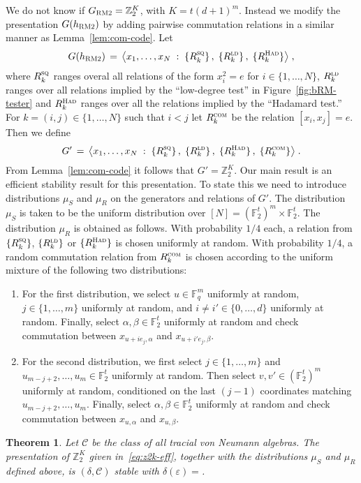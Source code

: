 \documentclass[11pt]{article}
\newtheorem{theorem}{Theorem}[section]
\theoremstyle{definition}
\newcommand{\F}{\ensuremath{\mathbb{F}}}
\newcommand{\ld}{\textsc{ld}}
\newcommand{\com}{\textsc{com}}
\newcommand{\sq}{\textsc{sq}}
\newcommand{\Z}{\ensuremath{\mathbb{Z}}}
\newcommand{\mC}{\ensuremath{\mathcal{C}}}
\newcommand{\bRM}{\ensuremath{\textsc{RM2}}}
\newcommand{\had}{\textsc{Had}}
\newcommand{\eps}{\varepsilon}
\begin{document}
We do not know if $G_\bRM = \Z_2^K$, with $K=t(d+1)^m$. Instead we modify the presentation $G(h_\bRM)$ by adding pairwise commutation relations in a similar manner as Lemma~\ref{lem:com-code}. Let 
\[ G(h_\bRM) \,=\, \big\langle x_1,\ldots,x_N \;:\; \{R^\sq_k\}\,,\; \{R^\ld_k\}\,,\; \{R^\had_{k}\} \big\rangle\;,\]
where  $R^\sq_k$ ranges overal all relations of the form $x_i^2=e$ for $i\in \{1,\ldots,N\}$, $R^\ld_k$ ranges over all relations implied by the ``low-degree test'' in Figure~\ref{fig:bRM-tester} and $R^\had_{k}$ ranges over all the relations implied by the ``Hadamard test.'' For $k=(i,j)\in\{1,\ldots,N\}$ such that $i<j$ let $R^\com_k$ be the relation $[x_i,x_j]=e$.
Then we define
\begin{equation}\label{eq:z2k-eff}
 G' \,=\,\big\langle x_1,\ldots,x_N \;:\; \{R^\sq_k\}\,,\; \{R^\ld_k\}\,,\; \{R^\had_{k}\}\, , \; \{ R^\com_k\}\big\rangle\;.
\end{equation}
From Lemma~\ref{lem:com-code} it follows that $G'=\Z_2^K$. Our main result is an efficient stability result for this presentation. To state this we need to introduce distributions $\mu_S$ and $\mu_R$ on the generators and relations of $G'$. The distribution $\mu_S$ is taken to be the uniform distribution over $[N] = (\F_2^t)^m \times \F_2^t$. The distribution $\mu_R$ is obtained as follows. With probability $1/4$ each, a relation from $\{R^\sq_k\}$, $\{R^\ld_k\}$ or $\{R^\had_k\}$ is chosen uniformly at random. With probability $1/4$, a random commutation relation from $R^\com_k$ is chosen according to the uniform mixture of the following two distributions:
\begin{enumerate}
\item For the first distribution, we select $u\in \F_q^m$ uniformly at random, $j\in\{1,\ldots,m\}$ uniformly at random, and $i\neq i'\in\{0,\ldots,d\}$ uniformly at random. Finally, select $\alpha,\beta\in \F_2^t$ uniformly at random and check commutation between $x_{u+i e_j,\alpha}$ and $x_{u+i' e_j,\beta}$. 
\item For the second distribution, we first select $j\in\{1,\ldots,m\}$ and $u_{m-j+2},\ldots,u_m \in \F_2^t$ uniformly at random. Then select $v,v' \in (\F_2^t)^m$ uniformly at random, conditioned on the last $(j-1)$ coordinates matching $u_{m-j+2},\ldots,u_m$. Finally, select $\alpha,\beta\in \F_2^t$ uniformly at random and check commutation between $x_{u,\alpha}$ and $x_{u,\beta}$. 
\end{enumerate}


\begin{theorem}\label{thm:z2-stab}
Let $\mC$ be the class of all tracial von Neumann algebras. 
The presentation of  $\Z_2^K$ given in~\eqref{eq:z2k-eff}, together with the distributions $\mu_S$ and $\mu_R$ defined above, is $(\delta,\mC)$ stable with $\delta(\eps)=$. 
\end{theorem}
\end{document}
